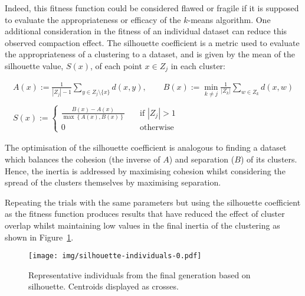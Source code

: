Indeed, this fitness function could be considered flawed or fragile if it is
supposed to evaluate the appropriateness or efficacy of the \(k\)-means
algorithm. One additional consideration in the fitness of an individual dataset
can reduce this observed compaction effect. The silhouette coefficient is a
metric used to evaluate the appropriateness of a clustering to a dataset, and is
given by the mean of the silhouette value, \(S(x)\), of each point \(x \in Z_j\)
in each cluster:

\begin{equation}
    \begin{gathered}
        A(x) := \frac{1}{|Z_j| - 1} \sum_{y \in Z_j \setminus \{x\}} d(x, y),
        \qquad B(x) := \min_{k \neq j} \frac{1}{|Z_k|} \sum_{w \in Z_k} d(x, w)
        \\\\
        S(x) := 
            \begin{cases}
                \frac{B(x) - A(x)}{\max\left\{A(x), B(x)\right\}}
                &\quad \text{if } |Z_j| > 1\\
                0 &\quad \text{otherwise}
            \end{cases}
    \end{gathered}
\end{equation}

The optimisation of the silhouette coefficient is analogous to finding a dataset
which balances the cohesion (the inverse of \(A\)) and separation (\(B\)) of its
clusters. Hence, the inertia is addressed by maximising cohesion whilst
considering the spread of the clusters themselves by maximising separation.

Repeating the trials with the same parameters but using the silhouette
coefficient as the fitness function produces results that have reduced the
effect of cluster overlap whilst maintaining low values in the final inertia of
the clustering as shown in Figure~\ref{figure:silhouette-individuals}.

\begin{figure}[htbp]
    \centering
    \texttt{[image: img/silhouette-individuals-0.pdf]}
    \caption{Representative individuals from the final generation based on
             silhouette. Centroids displayed as
             crosses.}\label{figure:silhouette-individuals}
\end{figure}



